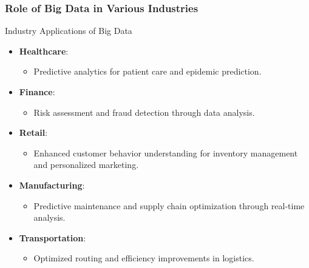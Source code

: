 \documentclass{beamer}
\begin{document}
\begin{frame}[fragile]
    \frametitle{Role of Big Data in Various Industries}
    \begin{block}{Industry Applications of Big Data}
        \begin{itemize}
            \item \textbf{Healthcare}:
            \begin{itemize}
                \item Predictive analytics for patient care and epidemic prediction.
            \end{itemize}

            \item \textbf{Finance}:
            \begin{itemize}
                \item Risk assessment and fraud detection through data analysis.
            \end{itemize}

            \item \textbf{Retail}:
            \begin{itemize}
                \item Enhanced customer behavior understanding for inventory management and personalized marketing.
            \end{itemize}

            \item \textbf{Manufacturing}:
            \begin{itemize}
                \item Predictive maintenance and supply chain optimization through real-time analysis.
            \end{itemize}

            \item \textbf{Transportation}:
            \begin{itemize}
                \item Optimized routing and efficiency improvements in logistics.
            \end{itemize}
        \end{itemize}
    \end{block}
\end{frame}
\end{document}
